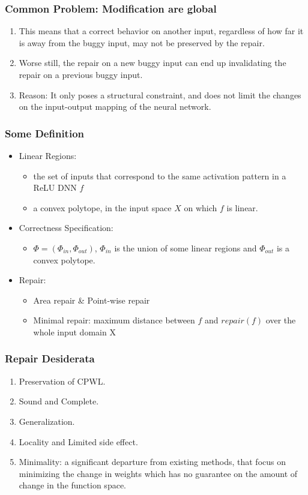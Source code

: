 \documentclass[aspectratio=169 %
,serif,mathserif]{beamer}
\begin{document}
\begin{frame}
	\frametitle{Common Problem: Modification are global}
	\begin{enumerate}
		\item This means that a correct behavior on another input, regardless of how far it is away from the buggy input, may not be preserved by the repair. \pause
		\item Worse still, the repair on a new buggy input can end up invalidating the repair on a previous buggy input. \pause
		\item Reason: It only poses a structural constraint, and does not limit the changes on the input-output mapping of the neural network.
	\end{enumerate}
\end{frame}

\begin{frame}
	\frametitle{Some Definition}
	\begin{itemize}
		\item Linear Regions:
		\begin{itemize}
			\item the set of inputs that correspond to the same activation pattern in a ReLU DNN $f$
			\item a convex polytope, in the input space $X$ on which $f$ is linear.
		\end{itemize} \pause

		\item Correctness Specification:
		\begin{itemize}
			\item $\Phi=\left(\Phi_{i n}, \Phi_{o u t}\right)$, $\Phi_{i n}$ is the union of some linear regions and $\Phi_{o u t}$ is a convex polytope.
		\end{itemize} \pause

		\item Repair:
		\begin{itemize}
			\item Area repair \& Point-wise repair
			\item Minimal repair: maximum distance between $f$ and $repair(f)$ over the whole input domain X
		\end{itemize} 

	\end{itemize}
\end{frame}

\begin{frame}
	\frametitle{Repair Desiderata}
	\begin{enumerate}
		\item Preservation of CPWL.
		\item Sound and Complete.
		\item Generalization.
		\item Locality and Limited side effect. \pause
		\item Minimality: a significant departure from existing methods, that focus on minimizing the change in weights which has no guarantee on the amount of change in the function space.
	\end{enumerate}
\end{frame}
\end{document}
